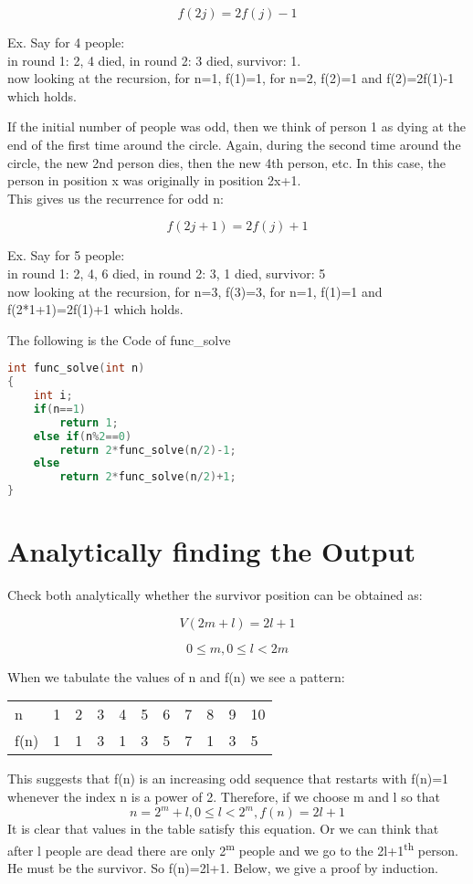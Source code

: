 \documentclass{article}
\begin{document}
 \[ f(2j)=2f(j)-1 \]

Ex. Say for 4 people:\\
in round 1: 2, 4 died, in round 2: 3 died, survivor: 1.\\
now looking at the recursion, for n=1, f(1)=1, for n=2, f(2)=1 and f(2)=2f(1)-1 which holds.

If the initial number of people was odd, then we think of person 1 as dying at the end of the first time around the circle. Again, during the second time around the circle, the new 2nd person dies, then the new 4th person, etc. In this case, the person in position x was originally in position 2x+1.
\\This gives us the recurrence for odd n:

 \[ f(2j+1)=2f(j)+1 \] 

Ex. Say for 5 people:\\
in round 1: 2, 4, 6 died, in round 2: 3, 1 died, survivor: 5\\
now looking at the recursion, for n=3, f(3)=3, for n=1, f(1)=1 and f(2*1+1)=2f(1)+1 which holds.

The following is the Code of func\_solve
\begin{lstlisting}[language=c, caption=func\_solve]
int func_solve(int n)
{
    int i;
    if(n==1)
        return 1;
    else if(n%2==0)
        return 2*func_solve(n/2)-1;
    else
        return 2*func_solve(n/2)+1;
}
\end{lstlisting}

\section{Analytically finding the Output}

Check both analytically whether the survivor position can be obtained as:

\[ V(2m + l) = 2l + 1 \]

\[ 0 \leq m , 0 \leq l < 2m \] 


When we tabulate the values of n and f(n) we see a pattern:\\
\begin{tabular}{l l l l l l l l l l l}
  n & 1 & 2 & 3 & 4 & 5 & 6 & 7 & 8 & 9 & 10\\
  f(n) & 1 & 1 & 3 & 1 & 3 & 5 & 7 & 1 & 3 & 5\\
\end{tabular}

This suggests that f(n) is an increasing odd sequence that restarts with f(n)=1 whenever the index n is a power of 2. Therefore, if we choose m and l so that \[ n = 2^m + l , 0 \leq l < 2^m , f(n)=2l+1 \] It is clear that values in the table satisfy this equation. Or we can think that after l people are dead there are only 2\textsuperscript{m} people and we go to the 2l+1\textsuperscript{th} person. He must be the survivor. So f(n)=2l+1. Below, we give a proof by induction.
\end{document}
